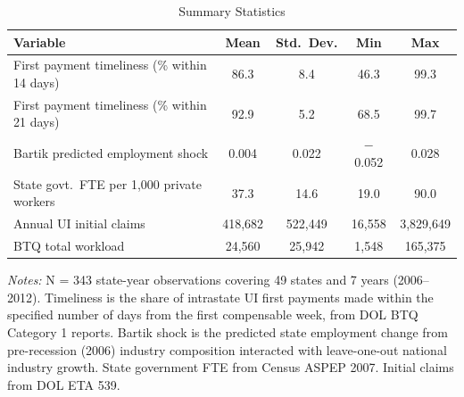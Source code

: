 \begin{table}[H]
\centering
\caption{Summary Statistics}
\begin{threeparttable}
\begin{tabular}{lcccc}
\toprule
Variable & Mean & Std.\ Dev. & Min & Max \\
\midrule
First payment timeliness (\% within 14 days) & 86.3 & 8.4 & 46.3 & 99.3 \\
First payment timeliness (\% within 21 days) & 92.9 & 5.2 & 68.5 & 99.7 \\
Bartik predicted employment shock & 0.004 & 0.022 & $-$0.052 & 0.028 \\
State govt.\ FTE per 1,000 private workers & 37.3 & 14.6 & 19.0 & 90.0 \\
Annual UI initial claims & 418,682 & 522,449 & 16,558 & 3,829,649 \\
BTQ total workload & 24,560 & 25,942 & 1,548 & 165,375 \\
\bottomrule
\end{tabular}
\begin{tablenotes}[flushleft]
\small
\item \textit{Notes:} N = 343 state-year observations covering 49 states and 7 years (2006--2012). Timeliness is the share of intrastate UI first payments made within the specified number of days from the first compensable week, from DOL BTQ Category 1 reports. Bartik shock is the predicted state employment change from pre-recession (2006) industry composition interacted with leave-one-out national industry growth. State government FTE from Census ASPEP 2007. Initial claims from DOL ETA 539.
\end{tablenotes}
\end{threeparttable}
\label{tab:summary}
\end{table}
